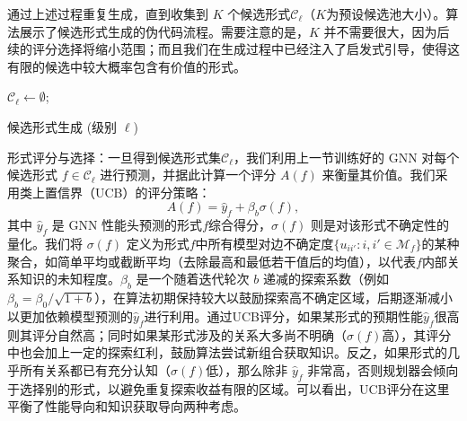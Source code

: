 \documentclass[../main.tex]{subfiles}
\begin{document}
通过上述过程重复生成，直到收集到 $K$ 个候选形式$\mathcal{C}_\ell$（$K$为预设候选池大小）。算法展示了候选形式生成的伪代码流程。需要注意的是，$K$ 并不需要很大，因为后续的评分选择将缩小范围；而且我们在生成过程中已经注入了启发式引导，使得这有限的候选中较大概率包含有价值的形式。

\begin{algorithm}[tb]
	\small
	\DontPrintSemicolon
	$\mathcal{C}_\ell \leftarrow \emptyset$;
	\caption{候选形式生成 (级别 $\ell$)}
	\label{alg:candidates}
\end{algorithm}

形式评分与选择：一旦得到候选形式集$\mathcal{C}_\ell$，我们利用上一节训练好的 GNN 对每个候选形式 $f\in\mathcal{C}_\ell$ 进行预测，并据此计算一个评分 $A(f)$ 来衡量其价值。我们采用类上置信界（UCB）的评分策略\cite{auer2002finite}：
\begin{equation}
	A(f) = \hat{y}_f + \beta_b \sigma(f),
\end{equation}
其中 $\hat{y}_f$ 是 GNN 性能头预测的形式$f$综合得分，$\sigma(f)$ 则是对该形式不确定性的量化。我们将 $\sigma(f)$ 定义为形式$f$中所有模型对边不确定度$\{u_{ii'}: i,i'\in \mathcal{M}_f\}$的某种聚合，如简单平均或截断平均（去除最高和最低若干值后的均值），以代表$f$内部关系知识的未知程度。$\beta_b$ 是一个随着迭代轮次 $b$ 递减的探索系数（例如$\beta_b = \beta_0 / \sqrt{1+b}$），在算法初期保持较大以鼓励探索高不确定区域，后期逐渐减小以更加依赖模型预测的$\hat{y}_f$进行利用。通过UCB评分，如果某形式的预期性能$\hat{y}_f$很高则其评分自然高；同时如果某形式涉及的关系大多尚不明确（$\sigma(f)$高），其评分中也会加上一定的探索红利，鼓励算法尝试新组合获取知识。反之，如果形式的几乎所有关系都已有充分认知（$\sigma(f)$低），那么除非 $\hat{y}_f$ 非常高，否则规划器会倾向于选择别的形式，以避免重复探索收益有限的区域。可以看出，UCB评分在这里平衡了性能导向和知识获取导向两种考虑。
\end{document}

